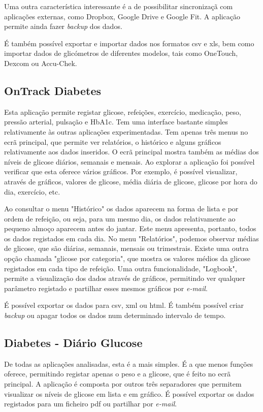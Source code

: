 Uma outra característica interessante é a de possibilitar sincronizaçã com aplicações externas, como Dropbox, Google Drive e Google Fit. A aplicação permite ainda fazer \textit{backup} dos dados.

É também possível exportar e importar dados nos formatos csv e xls, bem como importar dados de glicómetros de diferentes modelos, tais como OneTouch, Dexcom ou Accu-Chek.

\subsection{OnTrack Diabetes}

Esta aplicação permite registar glicose, refeições, exercício, medicação, peso, pressão arterial, pulsação e HbA1c. Tem uma interface bastante simples relativamente às outras aplicações experimentadas. Tem apenas três menus no ecrã principal, que permite ver relatórios, o histórico e alguns gráficos relativamente aos dados inseridos. O ecrã principal mostra também as médias dos níveis de glicose diários, semanais e mensais. Ao explorar a aplicação foi possível verificar que esta oferece vários gráficos. Por exemplo, é possível visualizar, através de gráficos, valores de glicose, média diária de glicose, glicose por hora do dia, exercício, etc.

Ao consultar o menu "Histórico" os dados aparecem na forma de lista e por ordem de refeição, ou seja, para um mesmo dia, os dados relativamente ao pequeno almoço aparecem antes do jantar. Este menu apresenta, portanto, todos os dados registados em cada dia. 
No menu "Relatórios", podemos observar médias de glicose, que são diárias, semanais, mensais ou trimestrais. Existe uma outra opção chamada "glicose por categoria", que mostra os valores médios da glicose registados em cada tipo de refeição.
Uma outra funcionalidade, "Logbook", permite a visualização dos dados através de gráficos, permitindo ver qualquer parâmetro registado e partilhar esses mesmos gráficos por \textit{e-mail}.

É possível exportar os dados para csv, xml ou html. É também possível criar \textit{backup} ou apagar todos os dados num determinado intervalo de tempo.

\subsection{Diabetes - Diário Glucose}

De todas as aplicações analisadas, esta é a mais simples. É a que menos funções oferece, permitindo registar apenas o peso e a glicose, que é feito no ecrã principal. A aplicação é composta por outros três separadores que permitem visualizar os níveis de glicose em lista e em gráfico. É possível exportar os dados registados para um ficheiro pdf ou partilhar por \textit{e-mail}.


